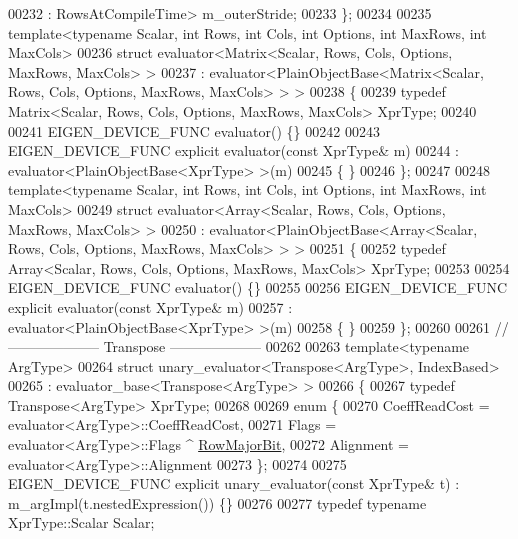 \begin{DoxyCode}
00232                                                     : RowsAtCompileTime> m\_outerStride;
00233 \};
00234 
00235 \textcolor{keyword}{template}<\textcolor{keyword}{typename} Scalar, \textcolor{keywordtype}{int} Rows, \textcolor{keywordtype}{int} Cols, \textcolor{keywordtype}{int} Options, \textcolor{keywordtype}{int} MaxRows, \textcolor{keywordtype}{int} MaxCols>
00236 \textcolor{keyword}{struct }evaluator<Matrix<Scalar, Rows, Cols, Options, MaxRows, MaxCols> >
00237   : evaluator<PlainObjectBase<Matrix<Scalar, Rows, Cols, Options, MaxRows, MaxCols> > >
00238 \{
00239   \textcolor{keyword}{typedef} Matrix<Scalar, Rows, Cols, Options, MaxRows, MaxCols> XprType;
00240   
00241   EIGEN\_DEVICE\_FUNC evaluator() \{\}
00242 
00243   EIGEN\_DEVICE\_FUNC \textcolor{keyword}{explicit} evaluator(\textcolor{keyword}{const} XprType& m)
00244     : evaluator<PlainObjectBase<XprType> >(m) 
00245   \{ \}
00246 \};
00247 
00248 \textcolor{keyword}{template}<\textcolor{keyword}{typename} Scalar, \textcolor{keywordtype}{int} Rows, \textcolor{keywordtype}{int} Cols, \textcolor{keywordtype}{int} Options, \textcolor{keywordtype}{int} MaxRows, \textcolor{keywordtype}{int} MaxCols>
00249 \textcolor{keyword}{struct }evaluator<Array<Scalar, Rows, Cols, Options, MaxRows, MaxCols> >
00250   : evaluator<PlainObjectBase<Array<Scalar, Rows, Cols, Options, MaxRows, MaxCols> > >
00251 \{
00252   \textcolor{keyword}{typedef} Array<Scalar, Rows, Cols, Options, MaxRows, MaxCols> XprType;
00253 
00254   EIGEN\_DEVICE\_FUNC evaluator() \{\}
00255   
00256   EIGEN\_DEVICE\_FUNC \textcolor{keyword}{explicit} evaluator(\textcolor{keyword}{const} XprType& m)
00257     : evaluator<PlainObjectBase<XprType> >(m) 
00258   \{ \}
00259 \};
00260 
00261 \textcolor{comment}{// -------------------- Transpose --------------------}
00262 
00263 \textcolor{keyword}{template}<\textcolor{keyword}{typename} ArgType>
00264 \textcolor{keyword}{struct }unary\_evaluator<Transpose<ArgType>, IndexBased>
00265   : evaluator\_base<Transpose<ArgType> >
00266 \{
00267   \textcolor{keyword}{typedef} Transpose<ArgType> XprType;
00268   
00269   \textcolor{keyword}{enum} \{
00270     CoeffReadCost = evaluator<ArgType>::CoeffReadCost,    
00271     Flags = evaluator<ArgType>::Flags ^ \hyperlink{group__flags_gae4f56c2a60bbe4bd2e44c5b19cbe8762}{RowMajorBit},
00272     Alignment = evaluator<ArgType>::Alignment
00273   \};
00274 
00275   EIGEN\_DEVICE\_FUNC \textcolor{keyword}{explicit} unary\_evaluator(\textcolor{keyword}{const} XprType& t) : m\_argImpl(t.nestedExpression()) \{\}
00276 
00277   \textcolor{keyword}{typedef} \textcolor{keyword}{typename} XprType::Scalar Scalar;

\end{DoxyCode}
